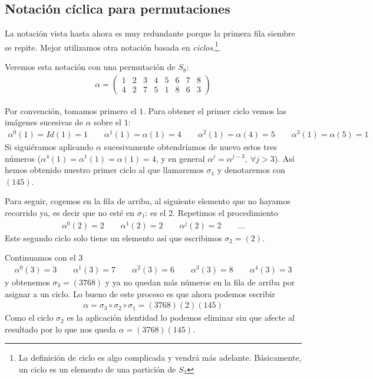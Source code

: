\subsection{Notación cíclica para permutaciones}
\label{sec:notacionciclica}

La notación vista hasta ahora es muy redundante porque la primera fila siembre se repite. Mejor utilizamos otra notación basada en \textit{ciclos}.\footnote{La definición de ciclo es algo complicada y vendrá más adelante. Básicamente, un ciclo es un elemento de una partición de $S_3$}.

Veremos esta notación con una permutación de $S_8$:
\begin{align*}
	\alpha = \left(\begin{array}{cccccccc}
	1 & 2 & 3 & 4 & 5 & 6 & 7 & 8 \\
	4 & 2 & 7 & 5 & 1 & 8 & 6 & 3
	\end{array}\right)
\end{align*}

Por convención, tomamos primero el $1$. Para obtener el primer ciclo vemos las imágenes sucesivas de $\alpha$ sobre el $1$:
\begin{align*}
	\alpha^0(1) = Id(1) = 1 \qquad \alpha^1(1) = \alpha(1) = 4 \qquad \alpha^2(1) = \alpha(4) = 5\qquad \alpha^3(1) = \alpha(5) = 1 
\end{align*}
Si siguiéramos aplicando $\alpha$ sucesivamente obtendríamos de nuevo estos tres números ($\alpha^4(1) = \alpha^1(1) = \alpha(1) = 4$, y en general $\alpha^j = \alpha^{j-3},\ \forall j > 3$). Así hemos obtenido nuestro primer ciclo al que llamaremos $\sigma_1$ y denotaremos con $(145)$.

Para seguir, cogemos en la fila de arriba, al siguiente elemento que no hayamos recorrido ya, es decir que no esté en $\sigma_1$: es el 2. Repetimos el procedimiento
\begin{align*}
	\alpha^0(2) = 2\qquad \alpha^1(2) = 2 \qquad \alpha^j(2) = 2 \qquad \dots
\end{align*}
Este segundo ciclo solo tiene un elemento así que escribimos $\sigma_2 = (2)$.

Continuamos con el 3
\begin{align*}
	\alpha^0(3) = 3 \qquad \alpha^1(3) = 7 \qquad \alpha^2(3) = 6 \qquad \alpha^3(3) = 8 \qquad \alpha^4(3) = 3
\end{align*}
y obtenemos $\sigma_3 = (3768)$ y ya no quedan más números en la fila de arriba por asignar a un ciclo. Lo bueno de este proceso es que ahora podemos escribir
\begin{align*}
	\alpha = \sigma_3 \circ \sigma_2 \circ  \sigma_1 = (3768)(2)(145)
\end{align*}
Como el ciclo $\sigma_2$ es la aplicación identidad lo podemos eliminar sin que afecte al resultado por lo que nos queda $\alpha = (3768)(145)$.

